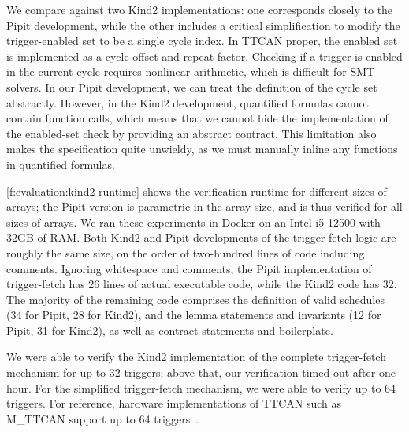 \documentclass[a4paper,UKenglish,cleveref, autoref, thm-restate,anonymous]{lipics-v2021}
\begin{document}
We compare against two Kind2 implementations: one corresponds closely to the Pipit development, while the other includes a critical simplification to modify the trigger-enabled set to be a single cycle index.
In TTCAN proper, the enabled set is implemented as a cycle-offset and repeat-factor.
Checking if a trigger is enabled in the current cycle requires nonlinear arithmetic, which is difficult for SMT solvers.
In our Pipit development, we can treat the definition of the cycle set abstractly.
However, in the Kind2 development, quantified formulas cannot contain function calls, which means that we cannot hide the implementation of the enabled-set check by providing an abstract contract.
This limitation also makes the specification quite unwieldy, as we must manually inline any functions in quantified formulas.

\autoref{f:evaluation:kind2-runtime} shows the verification runtime for different sizes of arrays; the Pipit version is parametric in the array size, and is thus verified for all sizes of arrays.
We ran these experiments in Docker on an Intel i5-12500 with 32GB of RAM.
Both Kind2 and Pipit developments of the trigger-fetch logic are roughly the same size, on the order of two-hundred lines of code including comments.
Ignoring whitespace and comments, the Pipit implementation of trigger-fetch has 26 lines of actual executable code, while the Kind2 code has 32.
The majority of the remaining code comprises the definition of valid schedules (34 for Pipit, 28 for Kind2), and the lemma statements and invariants (12 for Pipit, 31 for Kind2), as well as contract statements and boilerplate.

We were able to verify the Kind2 implementation of the complete trigger-fetch mechanism for up to 32 triggers; above that, our verification timed out after one hour.
For the simplified trigger-fetch mechanism, we were able to verify up to 64 triggers.
For reference, hardware implementations of TTCAN such as M_TTCAN support up to 64 triggers~\cite{bosch2019mttcan}.
\end{document}
